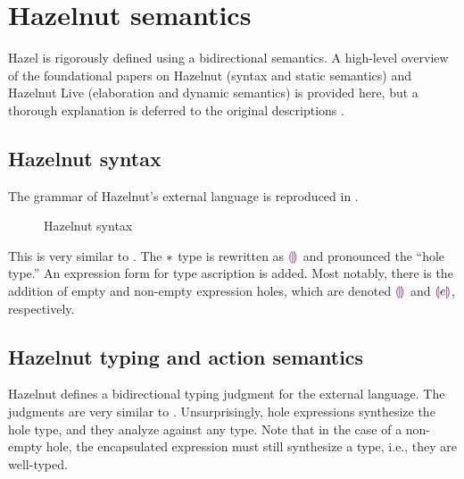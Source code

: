 \section{Hazelnut semantics}
\label{sec:hazel-semantics}

Hazel is rigorously defined using a bidirectional semantics. A high-level overview of the foundational papers on Hazelnut (syntax and static semantics) and Hazelnut Live (elaboration and dynamic semantics) is provided here, but a thorough explanation is deferred to the original descriptions \cite{conf/popl/Hazelnut17,conf/popl/HazelnutLive19}.

\subsection{Hazelnut syntax}
\label{sec:hazel-syntax}

The grammar of Hazelnut's external language is reproduced in .

\begin{figure}
  \centering
  \begin{singlespace}
    
  \end{singlespace}
  \caption{Hazelnut syntax}
  \label{fig:hazelnut-syntax}
\end{figure}

This is very similar to \gtlc{}. The $*{}$ type is rewritten as $\textcolor{violet}{\llparenthesis}\textcolor{violet}{\rrparenthesis}$ and pronounced the ``hole type.'' An expression form for type ascription is added. Most notably, there is the addition of empty and non-empty expression holes, which are denoted $\textcolor{violet}{\llparenthesis}\textcolor{violet}{\rrparenthesis}$ and $\textcolor{violet}{\llparenthesis} e\textcolor{violet}{\rrparenthesis}$, respectively.

\subsection{Hazelnut typing and action semantics}
\label{sec:hazel-statics}

Hazelnut \cite{conf/popl/Hazelnut17} defines a bidirectional typing judgment for the external language. The judgments are very similar to \gtlc{}. Unsurprisingly, hole expressions synthesize the hole type, and they analyze against any type. Note that in the case of a non-empty hole, the encapsulated expression must still synthesize a type, i.e., they are well-typed.


